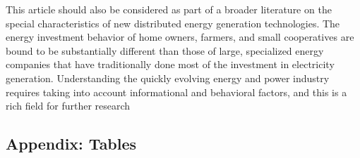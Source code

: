 \documentclass[12pt]{article}
\begin{document}
This article should also be considered as part of a broader literature on the special characteristics of new distributed energy generation technologies. The energy investment behavior of home owners, farmers, and small cooperatives are bound to be substantially different than those of large, specialized energy companies that have traditionally done most of the investment in electricity generation. Understanding the quickly evolving energy and power industry requires taking into account informational and behavioral factors, and this is a rich field for further research

\begin{spacing}{1}



\FloatBarrier

\appendix
\section{Appendix: Tables}


\end{spacing}
\end{document}
